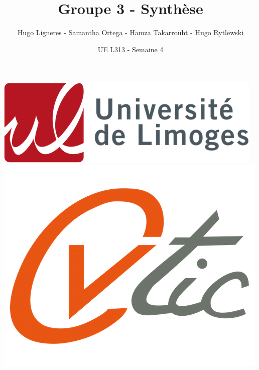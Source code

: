\documentclass[12pt,a4paper]{article}
\title{Groupe 3 - Synthèse}
\author{Hugo Ligneres - Samantha Ortega - Hamza Takarrouht - Hugo Rytlewski}
\date{UE L313 - Semaine 4}
\begin{document}
\maketitle

\hrulefill
\vspace{6cm}
\begin{center}
	\includegraphics[scale=.4]{../images/univ.png}
		\\
		\vspace{2cm}
	\includegraphics[scale=.25]{../images/cvtic.png}
\end{center}

\newpage

\tableofcontents

\newpage

\printbibliography
\end{document}
